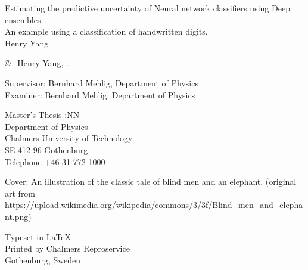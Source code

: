 \newpage
\thispagestyle{plain}
\vspace*{4.5cm}
Estimating the predictive uncertainty of Neural network classifiers using Deep ensembles.\\
An example using a classification of handwritten digits.\\
Henry Yang \setlength{\parskip}{1cm}

\copyright ~ Henry Yang, \the\year. \setlength{\parskip}{1cm}

Supervisor: Bernhard Mehlig, Department of Physics\\
Examiner: Bernhard Mehlig, Department of Physics \setlength{\parskip}{1cm}

Master's Thesis \the\year:NN\\	%
Department of Physics\\
Chalmers University of Technology\\
SE-412 96 Gothenburg\\
Telephone +46 31 772 1000 \setlength{\parskip}{0.5cm}

\vfill
Cover: An illustration of the classic tale of blind men and an elephant. (original art from \url{https://upload.wikimedia.org/wikipedia/commons/3/3f/Blind_men_and_elephant.png}) \setlength{\parskip}{0.5cm}

Typeset in \LaTeX \tagtemp\\
Printed by Chalmers Reproservice\\
Gothenburg, Sweden \the\year

